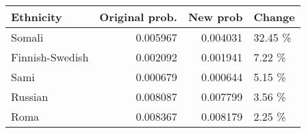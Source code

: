 \begin{tabular}{lrrl}
\toprule
      Ethnicity &  Original prob. &  New prob &  Change \\
\midrule
         Somali &        0.005967 &  0.004031 & 32.45 \% \\
Finnish-Swedish &        0.002092 &  0.001941 &  7.22 \% \\
           Sami &        0.000679 &  0.000644 &  5.15 \% \\
        Russian &        0.008087 &  0.007799 &  3.56 \% \\
           Roma &        0.008367 &  0.008179 &  2.25 \% \\
\bottomrule
\end{tabular}
